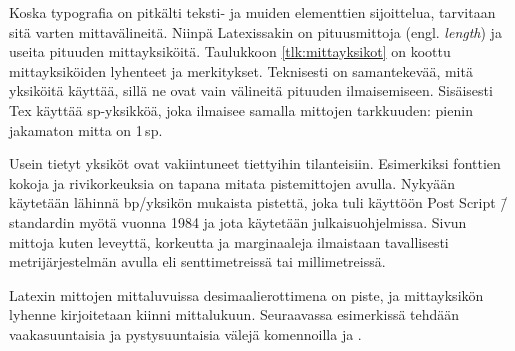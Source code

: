 Koska typografia on pitkälti teksti- ja muiden elementtien sijoittelua,
tarvitaan sitä varten mittavälineitä. Niinpä Latexissakin on
pituusmittoja (engl. \emph{length}) ja useita pituuden mittayksiköitä.
Taulukkoon \ref{tlk:mittayksikot} on koottu mittayksiköiden lyhenteet ja
merkitykset. Teknisesti on samantekevää, mitä yksiköitä käyttää, sillä
ne ovat vain välineitä pituuden ilmaisemiseen. Sisäisesti Tex käyttää
sp-yksikköä, joka ilmaisee samalla mittojen tarkkuuden: pienin jakamaton
mitta on 1\,sp.


Usein tietyt yksiköt ovat vakiintuneet tiettyihin tilanteisiin.
Esimerkiksi fonttien kokoja ja rivikorkeuksia on tapana mitata
pistemittojen avulla. Nykyään käytetään lähinnä bp\-/yksikön mukaista
pistettä, joka tuli käyttöön Post Script \=/standardin myötä vuonna 1984
ja jota käytetään julkaisuohjelmissa. Sivun mittoja kuten leveyttä,
korkeutta ja marginaaleja ilmaistaan tavallisesti metrijärjestelmän
avulla eli senttimetreissä tai millimetreissä.

Latexin mittojen mittaluvuissa desi\-maa\-li\-erot\-ti\-me\-na on piste,
ja mittayksikön lyhenne kirjoitetaan kiinni mittalukuun. Seuraavassa
esimerkissä tehdään vaakasuuntaisia ja pystysuuntaisia välejä
komennoilla  ja .

